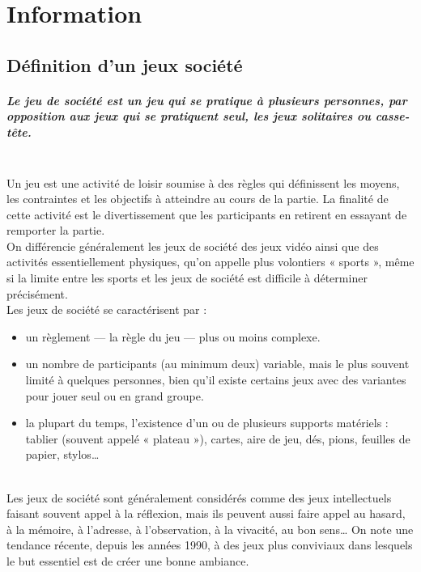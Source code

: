 \chapter{Information}

\section{Définition d'un jeux société}

\paragraph{Le jeu de société est un jeu qui se pratique à plusieurs personnes, par opposition aux jeux qui se pratiquent seul, les jeux solitaires ou casse-tête. }~\\

Un jeu est une activité de loisir soumise à des règles qui définissent les moyens, les contraintes et les objectifs à atteindre au cours de la partie. La finalité de cette activité est le divertissement que les participants en retirent en essayant de remporter la partie.\\

On différencie généralement les jeux de société des jeux vidéo ainsi que des activités essentiellement physiques, qu’on appelle plus volontiers « sports », même si la limite entre les sports et les jeux de société est difficile à déterminer précisément.\\

Les jeux de société se caractérisent par :

\begin{itemize}
	\item un règlement — la règle du jeu — plus ou moins complexe.
	\item un nombre de participants (au minimum deux) variable, mais le plus souvent limité à quelques personnes, bien qu’il existe certains jeux avec des variantes pour jouer seul ou en grand groupe.
	\item la plupart du temps, l’existence d’un ou de plusieurs supports matériels : tablier (souvent appelé « plateau »), cartes, aire de jeu, dés, pions, feuilles de papier, stylos…
\end{itemize}~\\

Les jeux de société sont généralement considérés comme des jeux intellectuels faisant souvent appel à la réflexion, mais ils peuvent aussi faire appel au hasard, à la mémoire, à l’adresse, à l’observation, à la vivacité, au bon sens… On note une tendance récente, depuis les années 1990, à des jeux plus conviviaux dans lesquels le but essentiel est de créer une bonne ambiance.\\

